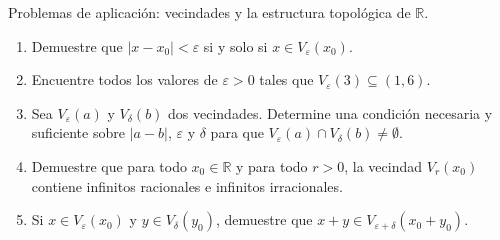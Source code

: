 \begin{prob}
Problemas de aplicación: vecindades y la estructura topológica de $\mathbb{R}$.

\begin{enumerate}
   \item Demuestre que $|x - x_0| < \varepsilon$ si y solo si
         $x \in V_\varepsilon(x_0)$.
   \item Encuentre todos los valores de $\varepsilon > 0$ tales que
         $V_\varepsilon(3) \subseteq (1, 6)$.
   \item Sea $V_\varepsilon(a)$ y $V_\delta(b)$ dos vecindades. Determine una
         condición necesaria y suficiente sobre $|a-b|$, $\varepsilon$ y
         $\delta$ para que $V_\varepsilon(a) \cap V_\delta(b) \neq \emptyset$.
   \item Demuestre que para todo $x_0 \in \mathbb{R}$ y para todo $r > 0$,
         la vecindad $V_r(x_0)$ contiene infinitos racionales e infinitos
         irracionales.
   \item Si $x \in V_\varepsilon(x_0)$ y $y \in V_\delta(y_0)$, demuestre
         que $x + y \in V_{\varepsilon+\delta}(x_0+y_0)$.
\end{enumerate}
\end{prob}